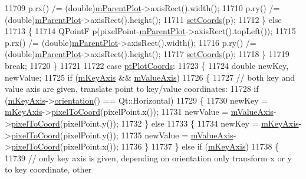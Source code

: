 \begin{DoxyCode}
11709         p.rx() /= (double)\hyperlink{a00032_a59b968410831ba91a25cc75a77dde6f5}{mParentPlot}->axisRect().width();
11710         p.ry() /= (double)\hyperlink{a00032_a59b968410831ba91a25cc75a77dde6f5}{mParentPlot}->axisRect().height();
11711         \hyperlink{a00038_aa988ba4e87ab684c9021017dcaba945f}{setCoords}(p);
11712       \} \textcolor{keywordflow}{else}
11713       \{
11714         QPointF p(pixelPoint-\hyperlink{a00032_a59b968410831ba91a25cc75a77dde6f5}{mParentPlot}->axisRect().topLeft());
11715         p.rx() /= (double)\hyperlink{a00032_a59b968410831ba91a25cc75a77dde6f5}{mParentPlot}->axisRect().width();
11716         p.ry() /= (double)\hyperlink{a00032_a59b968410831ba91a25cc75a77dde6f5}{mParentPlot}->axisRect().height();
11717         \hyperlink{a00038_aa988ba4e87ab684c9021017dcaba945f}{setCoords}(p);
11718       \}
11719       \textcolor{keywordflow}{break};
11720     \}
11721       
11722     \textcolor{keywordflow}{case} \hyperlink{a00038_aad9936c22bf43e3d358552f6e86dbdc8ad5ffb8dc99ad73263f7010c77342294c}{ptPlotCoords}:
11723     \{
11724       \textcolor{keywordtype}{double} newKey, newValue;
11725       \textcolor{keywordflow}{if} (\hyperlink{a00038_a05b13a027fd0b07663fd70b8ab1c8842}{mKeyAxis} && \hyperlink{a00038_acd281f6bd352758ff00d852f1f0fa06f}{mValueAxis})
11726       \{
11727         \textcolor{comment}{// both key and value axis are given, translate point to key/value coordinates:}
11728         \textcolor{keywordflow}{if} (\hyperlink{a00038_a05b13a027fd0b07663fd70b8ab1c8842}{mKeyAxis}->\hyperlink{a00025_a57483f2f60145ddc9e63f3af53959265}{orientation}() == Qt::Horizontal)
11729         \{
11730           newKey = \hyperlink{a00038_a05b13a027fd0b07663fd70b8ab1c8842}{mKeyAxis}->\hyperlink{a00025_ae9289ef7043b9d966af88eaa95b037d1}{pixelToCoord}(pixelPoint.x());
11731           newValue = \hyperlink{a00038_acd281f6bd352758ff00d852f1f0fa06f}{mValueAxis}->\hyperlink{a00025_ae9289ef7043b9d966af88eaa95b037d1}{pixelToCoord}(pixelPoint.y());
11732         \} \textcolor{keywordflow}{else}
11733         \{
11734           newKey = \hyperlink{a00038_a05b13a027fd0b07663fd70b8ab1c8842}{mKeyAxis}->\hyperlink{a00025_ae9289ef7043b9d966af88eaa95b037d1}{pixelToCoord}(pixelPoint.y());
11735           newValue = \hyperlink{a00038_acd281f6bd352758ff00d852f1f0fa06f}{mValueAxis}->\hyperlink{a00025_ae9289ef7043b9d966af88eaa95b037d1}{pixelToCoord}(pixelPoint.x());
11736         \}
11737       \} \textcolor{keywordflow}{else} \textcolor{keywordflow}{if} (\hyperlink{a00038_a05b13a027fd0b07663fd70b8ab1c8842}{mKeyAxis})
11738       \{
11739         \textcolor{comment}{// only key axis is given, depending on orientation only transform x or y to key coordinate, other
}
\end{DoxyCode}
